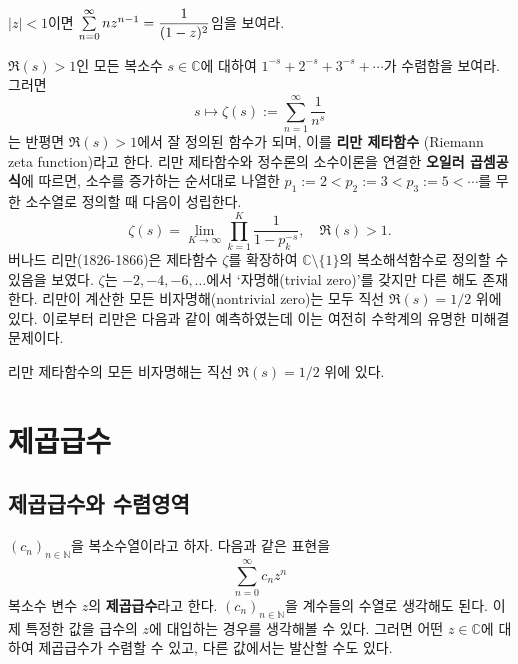 \begin{salt_exercise}\label{ex-4-4}
$|z|<1$이면 $\sum\limits_{n=0}^\infty nz^{n-1} = \displaystyle\frac1{(1-z)^2}$임을 보여라.
\end{salt_exercise}

\begin{salt_exercise}\label{ex-4-5}
$\Re(s)>1$인 모든 복소수 $s\in \mathbb C$에 대하여
$1^{-s} +  2^{-s} + 3^{-s} + \cdots$가 수렴함을 보여라.
그러면
\[
s \mapsto \zeta(s) := \sum_{n=1}^\infty \dfrac1{n^s}
\]
는 반평면 $\Re(s)>1$에서 잘 정의된 함수가 되며, 이를 
{\bf 리만 제타함수} (Riemann zeta function)라고 한다.
리만 제타함수와 정수론의 소수이론을 연결한 {\bf 오일러 곱셈공식}에 따르면,
소수를 증가하는 순서대로 나열한
$p_1:=2 < p_2:=3 < p_3:=5 < \cdots$를 무한 소수열로 정의할 때 다음이 성립한다.
\[
\zeta(s) = \lim_{K\to \infty} \prod_{k=1}^K \dfrac1{1-p_k^{-s}},
\quad \Re(s)>1.
\]
버나드 리만(1826-1866)은 제타함수 $\zeta$를 확장하여 $\mathbb C\setminus \{1\}$의 
복소해석함수로 정의할 수 있음을 보였다. 
$\zeta$는 $-2, -4, -6, \ldots$에서 `자명해(trivial zero)'를 갖지만
다른 해도 존재한다. 리만이 계산한 모든 비자명해(nontrivial zero)는 모두 직선 $\Re(s) = 1/2$ 위에
있다. 이로부터 리만은 다음과 같이 예측하였는데 이는 여전히 수학계의 유명한 미해결 문제이다.
\end{salt_exercise}

\begin{salt_conjecture} \label{conj-4-1}
리만 제타함수의 모든 비자명해는 직선 $\Re(s) = 1/2$ 위에 있다.
\end{salt_conjecture}

\section{제곱급수}

\subsection{제곱급수와 수렴영역}

$(c_n)_{n\in\mathbb N}$을 복소수열이라고 하자.
다음과 같은 표현을
\[
\sum_{n=0}^\infty c_nz^n
\]
복소수 변수 $z$의 \textbf{제곱급수}라고 한다. $(c_n)_{n\in\mathbb N}$을 계수들의 수열로 생각해도 된다.
이제 특정한 값을 급수의  $z$에 대입하는 경우를 생각해볼 수 있다.
그러면 어떤 $z\in\mathbb C$에 대하여 제곱급수가 수렴할 수 있고, 
다른 값에서는 발산할 수도 있다.

